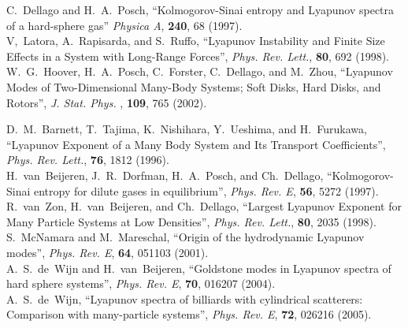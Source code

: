 \documentclass[a4paper, onecolumn]{revtex4-1}
\begin{document}
\begin{thebibliography}{1}
C.~Dellago and H.~A.~Posch, 
``Kolmogorov-Sinai entropy and Lyapunov spectra of a hard-sphere gas''  
{\em Physica A},  {\bf 240}, 68 (1997).
%
\\
%
V,~Latora, A.~Rapisarda, and S.~Ruffo, 
``Lyapunov Instability and Finite Size Effects in a System with Long-Range Forces'', 
{\em Phys. Rev. Lett.}, {\bf 80}, 692 (1998). 
%
\\
%
W.~G.~Hoover, H.~A.~Posch, C.~Forster, C.~Dellago, and M.~Zhou, 
``Lyapunov Modes of Two-Dimensional Many-Body Systems; Soft Disks, Hard Disks, and Rotors'', 
{\em J. Stat. Phys.} , {\bf 109}, 765 (2002).


D.~M.~Barnett, T.~Tajima, K.~Nishihara, Y.~Ueshima, and H.~Furukawa, 
``Lyapunov Exponent of a Many Body System and Its Transport Coefficients'', 
{\em Phys. Rev. Lett.},  {\bf 76}, 1812 (1996). 
%
\\
%
H.~van~Beijeren, J.~R.~Dorfman, H.~A.~Posch, and Ch.~Dellago, 
``Kolmogorov-Sinai entropy for dilute gases in equilibrium'', 
{\em Phys. Rev. E}, {\bf 56}, 5272 (1997). 
%
\\
%
R.~van~Zon, H.~van~Beijeren, and Ch.~Dellago, 
``Largest Lyapunov Exponent for Many Particle Systems at Low Densities'', 
{\em Phys. Rev. Lett.},  {\bf 80}, 2035 (1998). 
%
\\
%
S.~McNamara and M.~Mareschal, 
``Origin of the hydrodynamic Lyapunov modes'', 
{\em Phys. Rev. E},  {\bf 64}, 051103 (2001). 
%
\\
%
A.~S.~de~Wijn and H.~van~Beijeren, 
``Goldstone modes in Lyapunov spectra of hard sphere systems'', 
{\em Phys. Rev. E},  {\bf 70}, 016207 (2004).
%
\\
%
A.~S.~de~Wijn, 
``Lyapunov spectra of billiards with cylindrical scatterers: Comparison with many-particle
systems'', 
{\em Phys. Rev. E},  {\bf 72}, 026216 (2005). 




\end{thebibliography}
\end{document}
